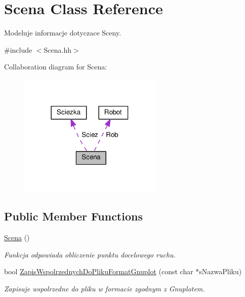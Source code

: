 \hypertarget{class_scena}{\section{Scena Class Reference}
\label{class_scena}
}


Modeluje informacje dotyczace Sceny.  




{\ttfamily \#include $<$Scena.\+hh$>$}



Collaboration diagram for Scena\+:
\nopagebreak
\begin{figure}[H]
\begin{center}
\leavevmode
\includegraphics[width=194pt]{class_scena__coll__graph}
\end{center}
\end{figure}
\subsection*{Public Member Functions}
\begin{DoxyCompactItemize}
\item 
\hypertarget{class_scena_a8f9fe11b4cfef890123a2acc94672e17}{\hyperlink{class_scena_a8f9fe11b4cfef890123a2acc94672e17}{Scena} ()}\label{class_scena_a8f9fe11b4cfef890123a2acc94672e17}

\begin{DoxyCompactList}\small\item\em Funkcja odpowiada obliczenie punktu docelowego ruchu. \end{DoxyCompactList}\item 
bool \hyperlink{class_scena_a2a314381bd96a25eb210c2f62348205e}{Zapis\+Wspolrzednych\+Do\+Pliku\+Format\+Gnuplot} (const char $\ast$s\+Nazwa\+Pliku)
\begin{DoxyCompactList}\small\item\em Zapisuje wspolrzedne do pliku w formacie zgodnym z Gnuplotem. \end{DoxyCompactList}\end{DoxyCompactItemize}
